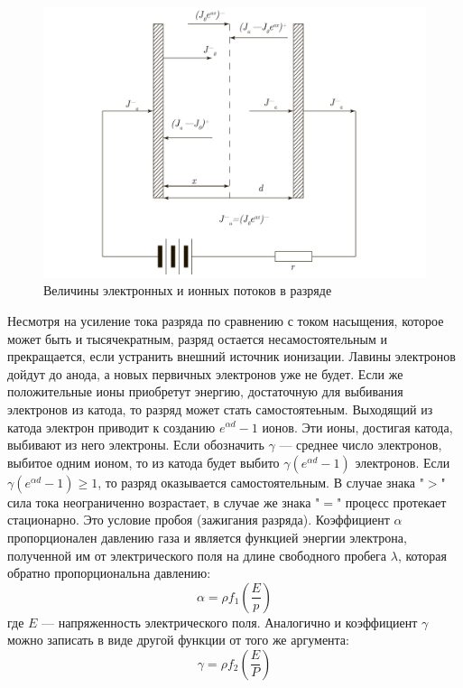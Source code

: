 \documentclass[a4paper, 12pt]{article}
\begin{document}
\begin{figure}[h]
\centering
\includegraphics[scale=0.4]{Graph3.pdf}
\caption{Величины электронных и ионных потоков в разряде}
\label{fig:Graph3}
\end{figure}
Несмотря на усиление тока разряда по сравнению с током насыщения, которое может быть и тысячекратным, разряд остается несамостоятельным и прекращается, если устранить внешний источник ионизации. Лавины электронов дойдут до анода, а новых первичных электронов уже не будет. Если же положительные ионы приобретут энергию, достаточную для выбивания электронов из катода, то разряд может стать самостоятеьным. Выходящий из катода электрон приводит к созданию $e^{\alpha d}-1$ ионов. Эти ионы, достигая катода, выбивают из него электроны. Если обозначить $\gamma$ — среднее число электронов, выбитое одним ионом, то из катода будет выбито $\gamma\left(e^{\alpha d}-1\right)$ электронов. Если $\gamma\left(e^{\alpha d}-1\right)\ge 1$, то разряд оказывается самостоятельным. В случае знака "$>$" сила тока неограниченно возрастает, в случае же знака "$=$"  процесс протекает стационарно. Это условие пробоя (зажигания разряда). Коэффициент $\alpha$ пропорционален давлению газа и является функцией энергии электрона, полученной им от электрического поля на длине свободного пробега $\lambda$, которая обратно пропорциональна давлению:
\begin{equation}
\alpha=\rho f_1\left(\frac{E}{p}\right)
\end{equation}
где $E$ — напряженность электрического поля. Аналогично и коэффициент $\gamma$ можно записать в виде другой функции от того же аргумента:
\begin{equation}
\gamma=\rho f_2\left(\frac{E}{P}\right)
\end{equation}
\end{document}
